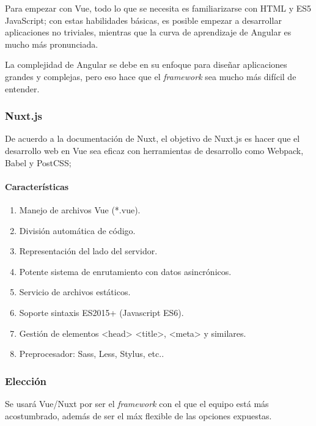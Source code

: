 Para empezar con Vue, todo lo que se necesita es familiarizarse con HTML y ES5 JavaScript; con estas habilidades básicas, es posible empezar a desarrollar aplicaciones no triviales, mientras que la curva de aprendizaje de Angular es mucho más pronunciada. 


La complejidad de Angular se debe en su enfoque para diseñar aplicaciones grandes y complejas, pero eso hace que el \textit{framework} sea mucho más difícil de entender.



\subsubsection*{Nuxt.js}
De acuerdo a la documentación de Nuxt\cite{noauthor_what_nodate-1}, el objetivo de Nuxt.js es hacer que el desarrollo web en Vue sea eficaz con herramientas de desarrollo como Webpack, Babel y PostCSS; 

\paragraph*{Características}
\begin{enumerate}
    \item Manejo de archivos Vue (*.vue).
    \item División automática de código.
    \item Representación del lado del servidor.
    \item Potente sistema de enrutamiento con datos asincrónicos.
    \item Servicio de archivos estáticos.
    \item Soporte sintaxis ES2015+ (Javascript ES6).
    \item Gestión de elementos <head> <title>, <meta> y similares.
    \item Preprocesador: Sass, Less, Stylus, etc..
\end{enumerate}



\subsubsection*{Elección}

Se usará Vue/Nuxt por ser el \textit{framework} con el que el equipo está más acostumbrado, además de ser el máx flexible de las opciones expuestas.